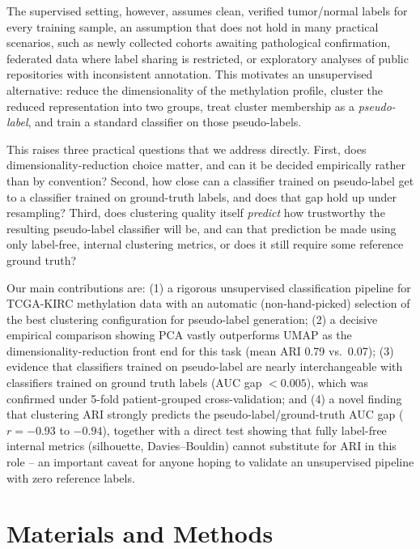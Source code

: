 \documentclass[sigconf]{acmart}
\begin{document}
The supervised setting, however, assumes clean, verified tumor/normal labels for every training sample, an assumption that does not hold in many practical scenarios, such as newly collected cohorts awaiting pathological confirmation, federated data where label sharing is restricted, or exploratory analyses of public repositories with inconsistent annotation. This motivates an unsupervised alternative: reduce the dimensionality of the methylation profile, cluster the reduced representation into two groups, treat cluster membership as a \emph{pseudo-label}, and train a standard classifier on those pseudo-labels.

This raises three practical questions that we address directly. First, does dimensionality-reduction choice matter, and can it be decided empirically rather than by convention? Second, how close can a classifier trained on pseudo-label get to a classifier trained on ground-truth labels, and does that gap hold up under resampling? Third, does clustering quality itself \emph{predict} how trustworthy the resulting pseudo-label classifier will be, and can that prediction be made using only label-free, internal clustering metrics, or does it still require some reference ground truth?

Our main contributions are: (1) a rigorous unsupervised classification pipeline for TCGA-KIRC methylation data with an automatic (non-hand-picked) selection of the best clustering configuration for pseudo-label generation; (2) a decisive empirical comparison showing PCA vastly outperforms UMAP as the dimensionality-reduction front end for this task (mean ARI 0.79 vs.\ 0.07); (3) evidence that classifiers trained on pseudo-label are nearly interchangeable with classifiers trained on ground truth labels (AUC gap $<0.005$), which was confirmed under 5-fold patient-grouped cross-validation; and (4) a novel finding that clustering ARI strongly predicts the pseudo-label/ground-truth AUC gap ($r=-0.93$ to $-0.94$), together with a direct test showing that fully label-free internal metrics (silhouette, Davies--Bouldin) cannot substitute for ARI in this role -- an important caveat for anyone hoping to validate an unsupervised pipeline with zero reference labels.

\section{Materials and Methods}
\end{document}
